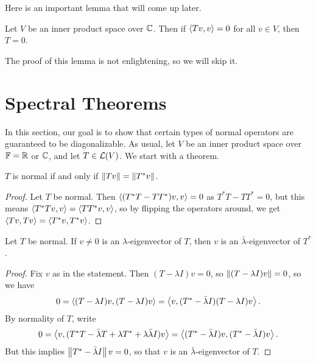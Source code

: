 \documentclass{article}
\begin{document}
Here is an important lemma that will come up later.
\begin{lemma}
Let $V$ be an inner product space over $\mathbb C$. Then if $\left\langle Tv, v\right\rangle = 0$ for all $v\in V$, then $T = 0$.
\end{lemma}
The proof of this lemma is not enlightening, so we will skip it.
\section{Spectral Theorems}
In this section, our goal is to show that certain types of normal operators are guaranteed to be diagonalizable. As usual, let $V$ be an inner product space over $\mathbb F = \mathbb R$ or $\mathbb C$, and let $T\in\mathcal L(V)$. We start with a theorem.
\begin{theorem}
$T$ is normal if and only if $\left\Vert Tv\right\Vert = \left\Vert T^*v\right\Vert$.
\end{theorem}
\begin{proof}
Let $T$ be normal. Then $\left\langle(T^*T - TT^*)v, v\right\rangle = 0$ as $T^*T - TT^* = 0$, but this means $\left\langle T^*Tv, v\right\rangle = \left\langle TT^*v, v\right\rangle$, so by flipping the operators around, we get $\left\langle Tv, Tv\right\rangle = \left\langle T^*v, T^*v\right\rangle$.
\end{proof}
\begin{theorem}
Let $T$ be normal. If $v\neq 0$ is an $\lambda$-eigenvector of $T$, then $v$ is an $\bar\lambda$-eigenvector of $T^*$.
\end{theorem}
\begin{proof}
Fix $v$ as in the statement. Then $(T-\lambda I)v = 0$, so $\left\Vert (T-\lambda I)v\right\Vert = 0$, so we have
$$0=\left\langle(T-\lambda I)v, (T-\lambda I)v\right\rangle = \left\langle v, (T^*-\bar\lambda I)(T-\lambda I)v\right\rangle.$$
By normality of $T$, write
$$0 = \left\langle v, (T^*T - \bar\lambda T + \lambda T^* + \lambda\bar\lambda I)v\right\rangle = \left\langle(T^*-\bar\lambda I)v, (T^*-\bar\lambda I)v\right\rangle.$$
But this implies $\left\Vert T^*-\bar\lambda I\right\Vert v = 0$, so that $v$ is an $\bar\lambda$-eigenvector of $T$.
\end{proof}
\end{document}
